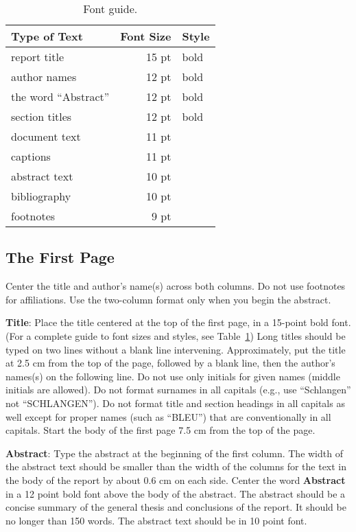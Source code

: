\documentclass[11pt]{article}
\begin{document}
\begin{table}[h]
\begin{center}
\begin{tabular}{|l|rl|}
\hline \bf Type of Text & \bf Font Size & \bf Style \\ \hline
report title & 15 pt & bold \\
author names & 12 pt & bold \\
the word ``Abstract'' & 12 pt & bold \\
section titles & 12 pt & bold \\
document text & 11 pt  &\\
captions & 11 pt & \\
abstract text & 10 pt & \\
bibliography & 10 pt & \\
footnotes & 9 pt & \\
\hline
\end{tabular}
\end{center}
\caption{\label{font-table} Font guide.}
\end{table}

\subsection{The First Page}
\label{ssec:first}

Center the title and author's name(s) across both
columns. Do not use footnotes for affiliations. Use the
two-column format only when you begin the abstract.

{\bf Title}: Place the title centered at the top of the first page, in
a 15-point bold font. (For a complete guide to font sizes and styles,
see Table~\ref{font-table}) Long titles should be typed on two lines
without a blank line intervening. Approximately, put the title at 2.5
cm from the top of the page, followed by a blank line, then the
author's names(s) on the following line. Do not
use only initials for given names (middle initials are allowed). Do
not format surnames in all capitals (e.g., use ``Schlangen'' not
``SCHLANGEN'').  Do not format title and section headings in all
capitals as well except for proper names (such as ``BLEU'') that are
conventionally in all capitals. Start the body of the first page 7.5 cm from the top of the
page.

{\bf Abstract}: Type the abstract at the beginning of the first
column. The width of the abstract text should be smaller than the
width of the columns for the text in the body of the report by about
0.6 cm on each side. Center the word {\bf Abstract} in a 12 point bold
font above the body of the abstract. The abstract should be a concise
summary of the general thesis and conclusions of the report. It should
be no longer than 150 words. The abstract text should be in 10 point font.
\end{document}
